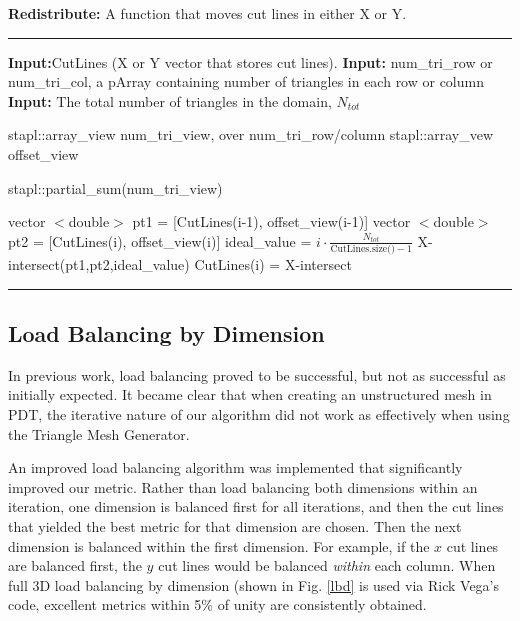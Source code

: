\documentclass[11pt, letterpaper,titlepage,oneside]{article}
\begin{document}
\noindent\begin{minipage}{\textwidth}
\textbf{Redistribute:} A function that moves cut lines in either X or Y. \\
\rule{\textwidth}{0.4pt}
\begin{algorithmic}
\STATE \textbf{Input:}CutLines (X or Y vector that stores cut lines). 
\STATE \textbf{Input:} num\_tri\_row or num\_tri\_col, a pArray containing number of triangles in each row or column 
\STATE \textbf{Input:} The total number of triangles in the domain, $N_{tot}$

\STATE stapl::array\_view num\_tri\_view, over num\_tri\_row/column
\STATE stapl::array\_vew offset\_view

\STATE stapl::partial\_sum(num\_tri\_view) 



	\STATE vector $<$double$>$ pt1 = [CutLines(i-1), offset\_view(i-1)]
	\STATE vector $<$double$>$ pt2 = [CutLines(i), offset\_view(i)]
	\STATE ideal\_value = $i\cdot \frac{N_{tot}}{\text{CutLines.size()}-1}$
	\STATE X-intersect(pt1,pt2,ideal\_value) 
	\STATE CutLines(i) = X-intersect
\ENDFOR
\end{algorithmic}
\rule{\textwidth}{0.4pt}
\end{minipage}

\subsection{Load Balancing by Dimension} \label{lbd_section}

In previous work, load balancing proved to be successful, but not as successful as initially expected. It became clear that when creating an unstructured mesh in PDT, the iterative nature of our algorithm did not work as effectively when using the Triangle Mesh Generator. 

An improved load balancing algorithm was implemented that significantly improved our metric. Rather than load balancing both dimensions within an iteration, one dimension is balanced first for all iterations, and then the cut lines that yielded the best metric for that dimension are chosen. Then the next dimension is balanced within the first dimension. For example, if the $x$ cut lines are balanced first, the $y$ cut lines would be balanced \textit{within} each column. When full 3D load balancing by dimension (shown in Fig. \ref{lbd} is used via Rick Vega's code, excellent metrics within 5\% of unity are consistently obtained.
\end{document}
